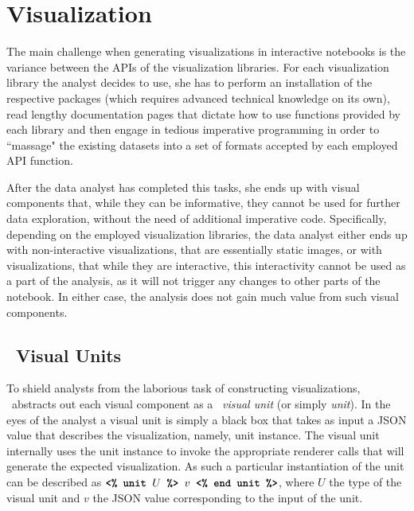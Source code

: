 \section{Visualization}
\label{section:visualization}



% 







The main challenge when generating visualizations in interactive notebooks is the variance between the APIs of the visualization libraries. For each visualization library the analyst decides to use, she has to perform an installation of the respective packages (which requires advanced technical knowledge on its own), read lengthy documentation pages that dictate how to use functions provided by each library and then engage in tedious imperative programming in order to ``massage" the existing datasets into a set of formats accepted by each employed API function.

After the data analyst has completed this tasks, she ends up with visual components that, while they can be informative, they cannot be used for further data exploration, without the need of additional imperative code. Specifically, depending on the employed visualization libraries, the data analyst either ends up with non-interactive visualizations, that are essentially static images, or with visualizations, that while they are interactive, this interactivity cannot be used as a part of the analysis, as it will not trigger any changes to other parts of the notebook. In either case, the analysis does not gain much value from such visual components.


\subsection{\projname\ Visual Units}
\label{section:visual Units}

\noindent To shield analysts from the laborious task of constructing visualizations, \projname\ abstracts out each visual component as a \projname\ \emph{visual unit} (or simply \emph{unit}). In the eyes of the analyst a visual unit is simply a black box that takes as input a JSON value that describes the visualization, namely, unit instance. The visual unit internally uses the unit instance to invoke the appropriate renderer calls that will generate the expected visualization. As such a particular instantiation of the unit  can be described as $\texttt{\textbf{<\% unit }} U \texttt{\textbf{ \%> }} v \texttt{\textbf{ <\% end unit \%>}}$, where $U$ the type of the visual unit and $v$ the JSON value corresponding to the input of the unit. 


